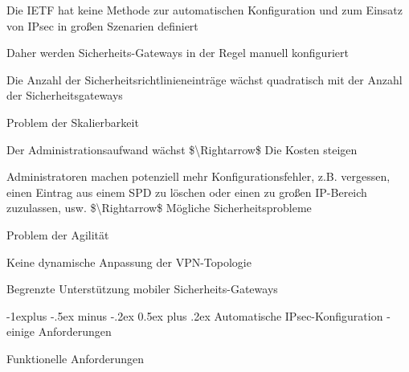 \documentclass[a4paper]{article}
\makeatletter
\renewcommand{\subsection}{\@startsection{subsection}{2}{0mm}%
 {-1explus -.5ex minus -.2ex}%
 {0.5ex plus .2ex}%
 {\normalfont\normalsize\bfseries}}
\makeatother
\begin{document}
\begin{multicols}{3}
\begin{itemize*}
            \begin{itemize*}
                  \item
                  Die IETF hat keine Methode zur automatischen Konfiguration und zum
                  Einsatz von IPsec in großen Szenarien definiert
                  \item
                  Daher werden Sicherheits-Gateways in der Regel manuell konfiguriert

                  \begin{itemize*}
                        \item Die Anzahl der Sicherheitsrichtlinieneinträge wächst quadratisch mit der Anzahl der Sicherheitsgateways
                        \item Problem der Skalierbarkeit
                        \begin{itemize*} \item Der Administrationsaufwand wächst \$\textbackslash Rightarrow\$ Die Kosten steigen \item Administratoren machen potenziell mehr Konfigurationsfehler, z.B. vergessen, einen Eintrag aus einem SPD zu löschen oder einen zu großen IP-Bereich zuzulassen, usw. \$\textbackslash Rightarrow\$ Mögliche Sicherheitsprobleme \end{itemize*}
                  \end{itemize*}
                  \item
                  Problem der Agilität

                  \begin{itemize*}
                        \item Keine dynamische Anpassung der VPN-Topologie
                        \item Begrenzte Unterstützung mobiler Sicherheits-Gateways
                  \end{itemize*}
            \end{itemize*}


            \subsection{Automatische IPsec-Konfiguration - einige
                  Anforderungen}

            \begin{itemize*}
                  \item
                  Funktionelle Anforderungen


\end{itemize*}
\end{itemize*}
\end{multicols}
\end{document}
